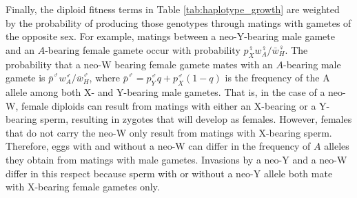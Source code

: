 \documentclass[12pt]{article}
\begin{document}
Finally, the diploid fitness terms in Table \ref{tab:haplotype_growth} are weighted by the probability of producing those genotypes through matings with gametes of the opposite sex. 
For example, matings between a neo-Y-bearing male gamete and an $A$-bearing female gamete occur with probability $p_{X}^{\female} w_{A}^{\female}/\bar{w}_{H}^{\female}$. 
The probability that a neo-W bearing female gamete mates with an $A$-bearing male gamete is $\bar{p}^{\male} w_{A}^{\male}/\bar{w}_{H}^{\male}$, where $\bar{p}^{\male}=p_{Y}^{\male}q+p_{X}^{\male}(1-q)$ is the frequency of the A allele among both X- and Y-bearing male gametes. 
That is, in the case of a neo-W, female diploids can result from matings with either an X-bearing or a Y-bearing sperm, resulting in zygotes that will develop as females. 
However, females that do not carry the neo-W only result from matings with X-bearing sperm. 
Therefore, eggs with and without a neo-W can differ in the frequency of $A$ alleles they obtain from matings with male gametes. 
Invasions by a neo-Y and a neo-W differ in this respect because sperm with or without a neo-Y allele both mate with X-bearing female gametes only.

\end{document}

